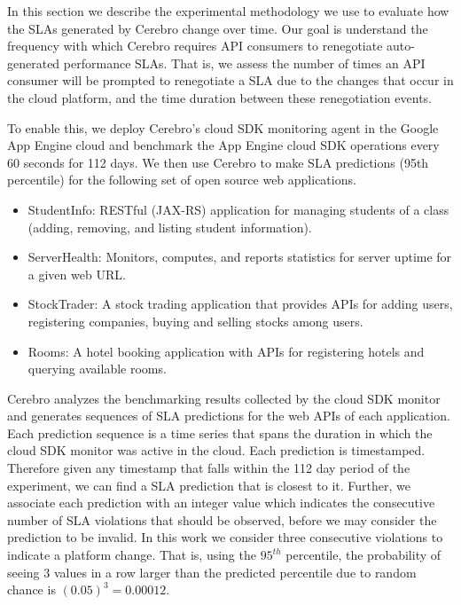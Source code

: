 In this section we describe the experimental methodology we use to evaluate how the SLAs
generated by Cerebro change over time. Our goal is understand the frequency with
which Cerebro requires API consumers to renegotiate auto-generated performance SLAs. That is,
we assess the number of times an API consumer will be prompted to renegotiate a
SLA due to the changes that occur in the cloud platform, and the time duration
between these renegotiation events.

To enable this, we deploy Cerebro's cloud 
SDK monitoring agent in the Google App Engine cloud and benchmark
the App Engine cloud SDK operations every 60 seconds for 112 days. We then use Cerebro
to make SLA predictions (95th percentile) for the following set of open source web applications. 

\begin{itemize}
\vspace{-0.05in}
\item StudentInfo: RESTful (JAX-RS) application for managing
students of a class (adding, removing, and listing student information).
\vspace{-0.05in}
\item ServerHealth: Monitors, computes, and reports statistics for server
uptime for a given web URL.
\vspace{-0.05in}
\item StockTrader: A stock trading application that
provides APIs for adding users, registering companies, buying and selling
stocks among users. 
\vspace{-0.05in}
\item Rooms: A hotel booking application with APIs
for registering hotels and querying available rooms.
\vspace{-0.05in}
\end{itemize}

Cerebro analyzes the benchmarking results collected
by the cloud SDK monitor and generates sequences of SLA predictions for the web APIs of each
application. Each prediction sequence
is a time series that spans the duration in which the cloud SDK monitor was active
in the cloud. Each prediction is timestamped. Therefore given any timestamp that falls within the
112 day period of the experiment, we can find a SLA prediction that is closest to it. 
Further, we associate each prediction with an integer value which indicates the consecutive 
number of SLA violations that should be
observed, before we may consider the prediction to be invalid. In this work we consider three
consecutive violations to indicate a platform change. That is,
using the $95^{th}$ percentile, the probability of seeing $3$
values in a row larger than the predicted percentile due to random chance
is $(0.05)^3 = 0.00012$.

